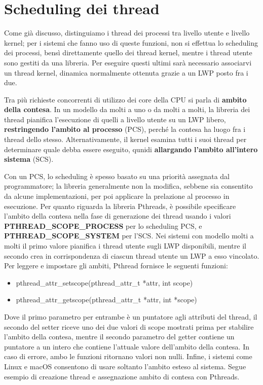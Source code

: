 %

\section{Scheduling dei thread}
Come già discusso, distinguiamo i thread dei processi tra livello utente e livello kernel; per i sistemi che fanno uso di queste funzioni, non si
effettua lo scheduling dei processi, bensì direttamente quello dei thread kernel, mentre i thread utente sono gestiti da una libreria. Per eseguire
questi ultimi sarà necessario associarvi un thread kernel, dinamica normalmente ottenuta grazie a un LWP posto fra i due.\par
Tra più richieste concorrenti di utilizzo dei core della CPU si parla di \textbf{ambito della contesa}. In un modello da molti a uno o da molti a molti,
la libreria dei thread pianifica l'esecuzione di quelli a livello utente su un LWP libero, \textbf{restringendo l'ambito al processo} (PCS), perché la
contesa ha luogo fra i thread dello stesso. Alternativamente, il kernel esamina tutti i suoi thread per determinare quale debba essere eseguito, qunidi
\textbf{allargando l'ambito all'intero sistema} (SCS).\par
Con un PCS, lo scheduling è spesso basato su una priorità assegnata dal programmatore; la libreria generalmente non la modifica, sebbene sia consentito
da alcune implementazioni, per poi applicare la prelazione al processo in esecuzione. Per quanto riguarda la libreria Pthreads, è possibile specificare
l'ambito della contesa nella fase di generazione dei thread usando i valori \textbf{PTHREAD\_SCOPE\_PROCESS} per lo scheduling PCS, e
\textbf{PTHREAD\_SCOPE\_SYSTEM} per l'SCS. Nei sistemi con modello molti a molti il primo valore pianifica i thread utente sugli LWP disponibili,
mentre il secondo crea in corrispondenza di ciascun thread utente un LWP a esso vincolato. Per leggere e impostare gli ambiti, Pthread fornisce le
seguenti funzioni: \begin{itemize}
    \item pthread\_attr\_setscope(pthread\_attr\_t *attr, int scope)
    \item pthread\_attr\_getscope(pthread\_attr\_t *attr, int *scope)
\end{itemize}
\noindent Dove il primo parametro per entrambe è un puntatore agli attributi del thread, il secondo del setter riceve uno dei due valori di scope
mostrati prima per stabilire l'ambito della contesa, mentre il secondo parametro del getter contiene un puntatore a un intero che contiene l'attuale
valore dell'ambito della contesa. In caso di errore, ambo le funzioni ritornano valori non nulli. Infine, i sistemi come Linux e macOS consentono di
usare soltanto l'ambito esteso al sistema. Segue esempio di creazione thread e assegnazione ambito di contesa con Pthreads.

